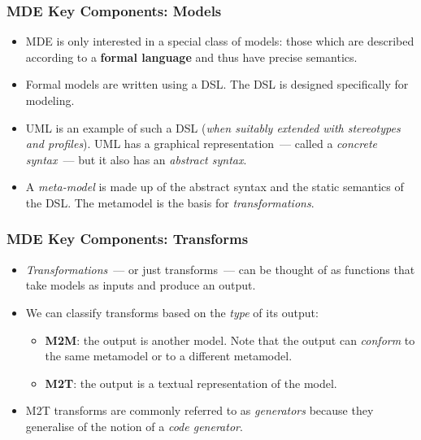 \documentclass{beamer}
\begin{document}
\begin{frame}
\frametitle{\ac{MDE} Key Components: Models}

\begin{itemize}

\item \ac{MDE} is only interested in a special class of models: those
  which are described according to a \textbf{formal language} and thus
  have precise semantics.

\pause

\item Formal models are written using a \acf{DSL}. The \ac{DSL} is
  designed specifically for modeling.

\pause

\item \acf{UML} is an example of such a \ac{DSL} (\emph{when suitably
  extended with stereotypes and profiles}). \ac{UML} has a graphical
  representation~--- called a \emph{concrete syntax}~--- but it also
  has an \emph{abstract syntax}.

\pause

\item A \emph{meta-model} is made up of the abstract syntax and the
  static semantics of the \ac{DSL}. The metamodel is the basis for
  \emph{transformations}.

\end{itemize}

\end{frame}

\begin{frame}
\frametitle{\ac{MDE} Key Components: Transforms}

\begin{itemize}
\item \emph{Transformations}~--- or just transforms~--- can be thought
  of as functions that take models as inputs and produce an output.

\pause

\item We can classify transforms based on the \emph{type} of its
  output:

\pause

\begin{itemize}

\item \textbf{\acf{M2M}}: the output is another model. Note that the
  output can \emph{conform} to the same metamodel or to a different
  metamodel.

\pause

\item \textbf{\acf{M2T}}: the output is a textual representation of
  the model.

\end{itemize}

\pause

\item \ac{M2T} transforms are commonly referred to as
  \emph{generators} because they generalise of the notion of a
  \emph{code generator}.

\end{itemize}

\end{frame}
\end{document}
